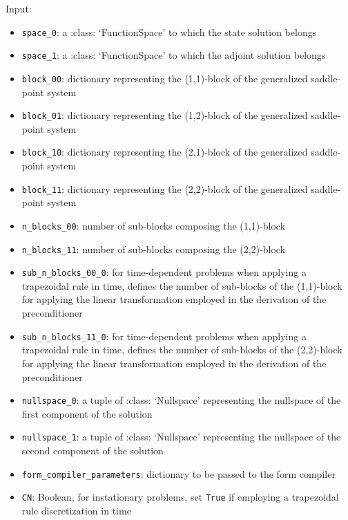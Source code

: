 \documentclass[letterpaper,10pt,english]{sphinxmanual}
\begin{document}
Input:
\begin{itemize}
\item \texttt{space{\_}0}: a :class: `FunctionSpace' to which the state solution
        belongs

\item \texttt{space{\_}1}: a :class: `FunctionSpace' to which the adjoint solution
        belongs

\item \texttt{block{\_}00}: dictionary representing the (1,1)-block of the
        generalized saddle-point system

\item \texttt{block{\_}01}: dictionary representing the (1,2)-block of the
        generalized saddle-point system

\item \texttt{block{\_}10}: dictionary representing the (2,1)-block of the
        generalized saddle-point system

\item \texttt{block{\_}11}: dictionary representing the (2,2)-block of the
        generalized saddle-point system

\item \texttt{n{\_}blocks{\_}00}: number of sub-blocks composing the (1,1)-block

\item \texttt{n{\_}blocks{\_}11}: number of sub-blocks composing the (2,2)-block

\item \texttt{sub{\_}n{\_}blocks{\_}00{\_}0}: for time-dependent problems when applying
        a trapezoidal rule in time, defines the number of sub-blocks of
        the (1,1)-block for applying the linear transformation employed in
        the derivation of the preconditioner

\item \texttt{sub{\_}n{\_}blocks{\_}11{\_}0}: for time-dependent problems when applying
        a trapezoidal rule in time, defines the number of sub-blocks of
        the (2,2)-block for applying the linear transformation employed in
        the derivation of the preconditioner

\item \texttt{nullspace{\_}0}: a tuple of :class: `Nullspace' representing the
        nullspace of the first component of the solution

\item \texttt{nullspace{\_}1}: a tuple of :class: `Nullspace' representing the
        nullspace of the second component of the solution

\item \texttt{form{\_}compiler{\_}parameters}: dictionary to be passed to the form
        compiler

\item \texttt{CN}: Boolean, for instationary problems, set \texttt{True} if employing a trapezoidal rule discretization in time
\end{itemize}
\end{document}
